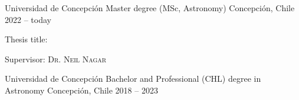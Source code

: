 
\begin{cventries}

  \cventry
    {Universidad de Concepción}
    {Master degree (MSc, Astronomy)}
    {Concepción, Chile}
    {2022 -- today}
    {
      \begin{cvitems}
        \item{Thesis title: }
        \item{Supervisor: \textsc{Dr. Neil Nagar}}
      \end{cvitems}
      \vspace{1em}
    }
  \cventry
    {Universidad de Concepción}
    {Bachelor and Professional (CHL) degree in Astronomy}
    {Concepción, Chile}
    {2018 -- 2023}
    {}

\end{cventries}
